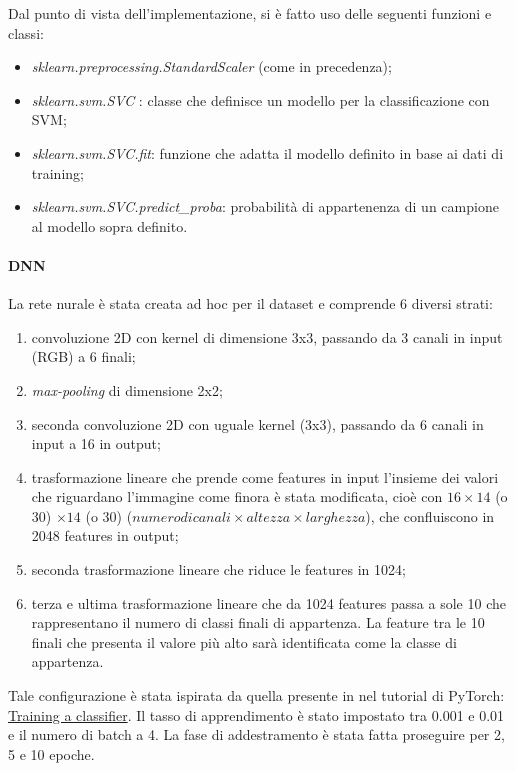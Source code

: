 \documentclass[11pt, a4paper, titlepage]{article}
\begin{document}
\medskip
Dal punto di vista dell'implementazione, si è fatto uso delle seguenti funzioni e classi:
\begin{itemize}
    \item \emph{sklearn.preprocessing.StandardScaler} \cite{scikit-learn} (come in precedenza);
    \item \emph{sklearn.svm.SVC} \cite{scikit-learn}: classe che definisce un modello per la classificazione con SVM;
    \item \emph{sklearn.svm.SVC.fit}: funzione che adatta il modello definito in base ai dati di training;
    \item \emph{sklearn.svm.SVC.predict\_proba}: probabilità di appartenenza di un campione al modello sopra definito.
\end{itemize}

\paragraph{DNN}
La rete nurale è stata creata ad hoc per il dataset e comprende 6 diversi strati:
\begin{enumerate}
    \item convoluzione 2D con kernel di dimensione 3x3, passando da 3 canali in input (RGB) a 6 finali;
    \item \emph{max-pooling} di dimensione 2x2;
    \item seconda convoluzione 2D con uguale kernel (3x3), passando da 6 canali in input a 16 in output;
    \item trasformazione lineare che prende come features in input l'insieme dei valori che riguardano l'immagine come finora è stata modificata, cioè con $16 \times 14$ (o 30) $\times 14$ (o 30) ($numero di canali \times altezza \times larghezza$), che confluiscono in 2048 features in output;
    \item seconda trasformazione lineare che riduce le features in 1024;
    \item terza e ultima trasformazione lineare che da 1024 features passa a sole 10 che rappresentano il numero di classi finali di appartenza. La feature tra le 10 finali che presenta il valore più alto sarà identificata come la classe di appartenza.
\end{enumerate}
Tale configurazione è stata ispirata da quella presente in nel tutorial di PyTorch: \href{https://pytorch.org/tutorials/beginner/blitz/cifar10_tutorial.html}{Training a classifier}. Il tasso di apprendimento è stato impostato tra 0.001 e 0.01 e il numero di batch a 4. La fase di addestramento è stata fatta proseguire per 2, 5 e 10 epoche. 
\end{document}
